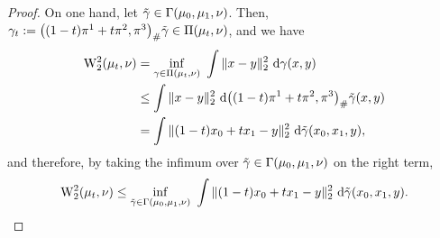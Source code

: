 \documentclass[twoside]{article}
\newcommand{\W}{\mathrm{W}}
\begin{document}
\begin{proof}
    On one hand, let $\Tilde{\gamma}\in\Gamma(\mu_0,\mu_1,\nu)$. Then, $\gamma_t := \big((1-t)\pi^1 + t\pi^2, \pi^3\big)_\#\Tilde{\gamma}\in\Pi(\mu_t,\nu)$, and we have 
    \begin{equation}
        \begin{aligned}
            \W_2^2(\mu_t,\nu) &= \inf_{\gamma\in\Pi(\mu_t,\nu)}\ \int \|x-y\|_2^2\ \mathrm{d}\gamma(x,y) \\
            &\le \int \|x-y\|_2^2 \ \mathrm{d}\big((1-t)\pi^1 + t\pi^2, \pi^3\big)_\#\Tilde{\gamma}(x,y) \\
            &= \int \|(1-t) x_0 + tx_1 - y\|_2^2\ \mathrm{d}\Tilde{\gamma}(x_0,x_1,y),
        \end{aligned}
    \end{equation}
    and therefore, by taking the infimum over $\Tilde{\gamma}\in\Gamma(\mu_0,\mu_1,\nu)$ on the right term,
    \begin{equation}
        \W_2^2(\mu_t, \nu) \le \inf_{\Tilde{\gamma}\in \Gamma(\mu_0,\mu_1,\nu)}\ \int \|(1-t)x_0+tx_1 - y\|_2^2\ \mathrm{d}\Tilde{\gamma}(x_0,x_1,y).
    \end{equation}


\end{proof}
\end{document}
